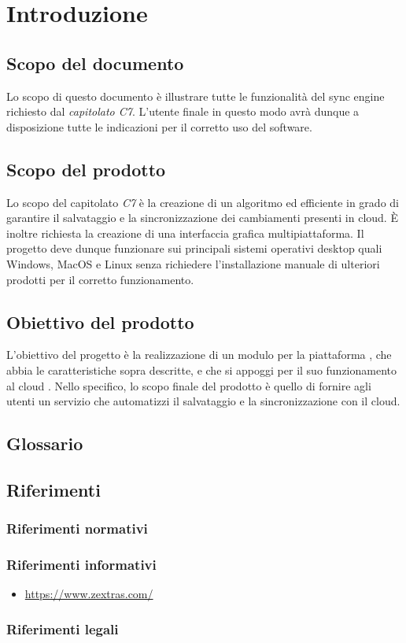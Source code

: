 \section{Introduzione}
\subsection{Scopo del documento}
Lo scopo di questo documento è illustrare tutte le funzionalità del sync engine richiesto dal \textit{capitolato C7}. L'utente finale in questo modo avrà dunque a disposizione tutte le indicazioni per il corretto uso del software.

\subsection{Scopo del prodotto}
Lo scopo del capitolato \textit{C7} è la creazione di un algoritmo  ed efficiente in grado di garantire il salvataggio e la sincronizzazione dei cambiamenti presenti in cloud. È inoltre richiesta la creazione di una interfaccia grafica multipiattaforma. Il progetto deve dunque funzionare sui principali sistemi operativi desktop quali Windows, MacOS e Linux senza richiedere l'installazione manuale di ulteriori prodotti per il corretto funzionamento. 
\subsection{Obiettivo del prodotto}
L'obiettivo del progetto è la realizzazione di un modulo per la piattaforma , che abbia le caratteristiche sopra descritte, e che si appoggi per il suo funzionamento al cloud .
Nello specifico, lo scopo finale del prodotto è quello di fornire agli utenti un servizio che automatizzi il salvataggio e la sincronizzazione con il cloud.

\subsection{Glossario}

\subsection{Riferimenti}
\subsubsection{Riferimenti normativi}

\subsubsection{Riferimenti informativi}

\begin{itemize}
	\item \url{https://www.zextras.com/}
\end{itemize}

\subsubsection{Riferimenti legali}


